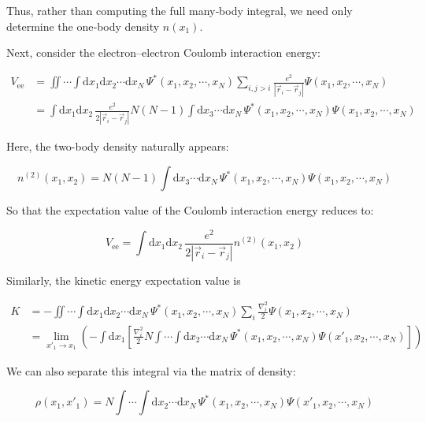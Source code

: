 Thus, rather than computing the full many‐body integral, we need only determine the one‐body density $n(x_1)$.

Next, consider the electron–electron Coulomb interaction energy:

\begin{equation}
\begin{aligned}
    V_\mathrm{ee}
    &= \iint\cdots\int \mathrm{d}x_1\mathrm{d}x_2\cdots\mathrm{d}x_N\,\Psi^*(x_1,x_2,\cdots,x_N)\sum_{i,j>i}\frac{e^2}{|\vec{r}_i-\vec{r}_j|}\Psi(x_1,x_2,\cdots,x_N) \\
    &= \int\mathrm{d}x_1\mathrm{d}x_2\,\frac{e^2}{2|\vec{r}_i-\vec{r}_j|}N(N-1)\int\mathrm{d}x_3\cdots\mathrm{d}x_N\,\Psi^*(x_1,x_2,\cdots,x_N)\Psi(x_1,x_2,\cdots,x_N)
\end{aligned}
\label{coulomb_interaction_energy}
\end{equation}

Here, the two-body density naturally appears:

\begin{equation}
n^{(2)}(x_1,x_2)=N(N-1)\int\mathrm{d}x_3\cdots\mathrm{d}x_N\,\Psi^*(x_1,x_2,\cdots,x_N)\Psi(x_1,x_2,\cdots,x_N)
\label{two-body_density}
\end{equation}

So that the expectation value of the Coulomb interaction energy reduces to:

\begin{equation}
V_\mathrm{ee}=\int\mathrm{d}x_1\mathrm{d}x_2\,\frac{e^2}{2|\vec{r}_i-\vec{r}_j|}n^{(2)}(x_1,x_2)
\label{observables_two-body_density}
\end{equation}

Similarly, the kinetic energy expectation value is

\begin{equation}
\begin{aligned}
    K&= -\iint\cdots\int \mathrm{d}x_1\mathrm{d}x_2\cdots\mathrm{d}x_N\,\Psi^*(x_1,x_2,\cdots,x_N)\sum_{i}\frac{\nabla_i^2}{2}\Psi(x_1,x_2,\cdots,x_N) \\
    &= \lim_{x'_1\to x_1}\left( -\int\mathrm{d}x_1\left[\frac{\nabla_i^2}{2}N\int\cdots\int\mathrm{d}x_2\cdots\mathrm{d}x_N\,\Psi^*(x_1,x_2,\cdots,x_N)\Psi(x'_1,x_2,\cdots,x_N) \right]\right)
\end{aligned}
\label{kinetic_energy}
\end{equation}

We can also separate this integral via the matrix of density:

\begin{equation}
\rho(x_1,x'_1)
=N\int\cdots\int\mathrm{d}x_2\cdots\mathrm{d}x_N\,\Psi^*(x_1,x_2,\cdots,x_N)\Psi(x'_1,x_2,\cdots,x_N) 
\label{density_matrix}
\end{equation}

